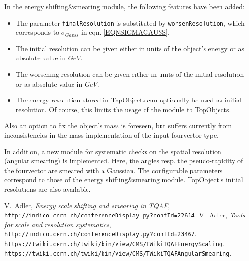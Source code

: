 \documentclass{cmspaper}
\newcommand{\sns}{energy shifting{\&}smearing module}
\begin{document}
  In the \sns , the following features have been added:
  \begin{itemize}
   \item
    The parameter {\tt finalResolution} is substituted by {\tt worsenResolution}, which corresponds to $\sigma_{Gauss}$ in eqn. \ref{EQNSIGMAGAUSS}.
   \item
    The initial resolution can be given either in units of the object's energy or as absolute value in $GeV$.
   \item
    The worsening resolution can be given either in units of the initial resolution or as absolute value in $GeV$.
   \item
    The energy resolution stored in TopObjects can optionally be used as initial resolution.
    Of course, this limits the usage of the module to TopObjects.
  \end{itemize}
  Also an option to fix the object's mass is foreseen, but suffers currently from inconsistencies in the mass implementation of the input fourvector type.

  In addition, a new module for systematic checks on the spatial resolution (angular smearing) is implemented\cite{Adler:2007d}.
  Here, the angles resp. the pseudo-rapidity of the fourvector are smeared with a Gaussian.
  The configurable parameters correspond to those of the \sns .
  TopObject's initial resolutions are also available.


\begin{thebibliography}{mm}
  V.~Adler,
  {\em Energy scale shifting and smearing in TQAF},\\
  {\tt http://indico.cern.ch/conferenceDisplay.py?confId=22614}.
  V.~Adler,
  {\em Tools for scale and resolution systematics},\\
  {\tt http://indico.cern.ch/conferenceDisplay.py?confId=23467}.
  {\tt https://twiki.cern.ch/twiki/bin/view/CMS/TWikiTQAFEnergyScaling}.
  {\tt https://twiki.cern.ch/twiki/bin/view/CMS/TWikiTQAFAngularSmearing}.
\end{thebibliography}
\end{document}
